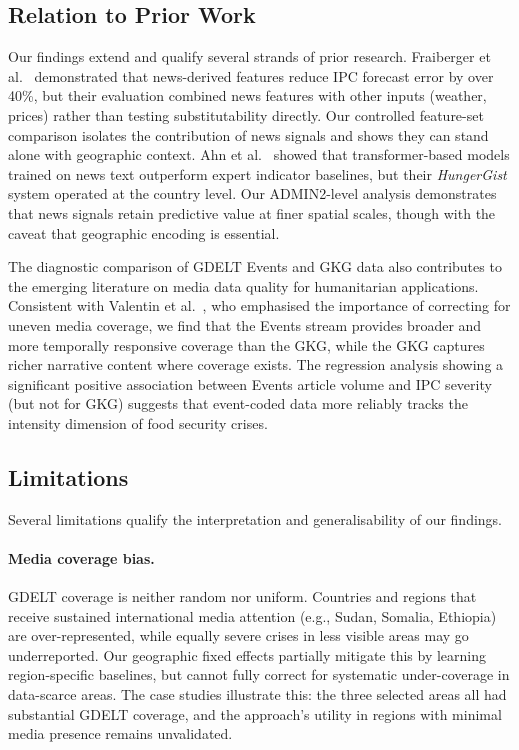 \documentclass{article}
\begin{document}
\subsection{Relation to Prior Work}

Our findings extend and qualify several strands of prior research. Fraiberger et al.~\citep{Fraiberger2023} demonstrated that news-derived features reduce IPC forecast error by over 40\%, but their evaluation combined news features with other inputs (weather, prices) rather than testing substitutability directly. Our controlled feature-set comparison isolates the contribution of news signals and shows they can stand alone with geographic context. Ahn et al.~\citep{Ahn2023} showed that transformer-based models trained on news text outperform expert indicator baselines, but their \textit{HungerGist} system operated at the country level. Our ADMIN2-level analysis demonstrates that news signals retain predictive value at finer spatial scales, though with the caveat that geographic encoding is essential.

The diagnostic comparison of GDELT Events and GKG data also contributes to the emerging literature on media data quality for humanitarian applications. Consistent with Valentin et al.~\citep{Valentin2024}, who emphasised the importance of correcting for uneven media coverage, we find that the Events stream provides broader and more temporally responsive coverage than the GKG, while the GKG captures richer narrative content where coverage exists. The regression analysis showing a significant positive association between Events article volume and IPC severity (but not for GKG) suggests that event-coded data more reliably tracks the intensity dimension of food security crises.

\subsection{Limitations}

Several limitations qualify the interpretation and generalisability of our findings.

\paragraph{Media coverage bias.}
GDELT coverage is neither random nor uniform. Countries and regions that receive sustained international media attention (e.g., Sudan, Somalia, Ethiopia) are over-represented, while equally severe crises in less visible areas may go underreported. Our geographic fixed effects partially mitigate this by learning region-specific baselines, but cannot fully correct for systematic under-coverage in data-scarce areas. The case studies illustrate this: the three selected areas all had substantial GDELT coverage, and the approach's utility in regions with minimal media presence remains unvalidated.
\end{document}
